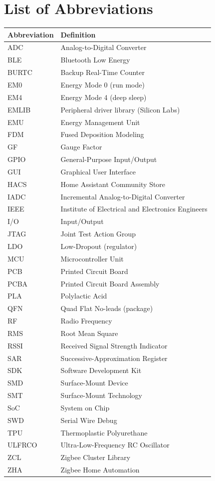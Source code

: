 \chapter*{List of Abbreviations}

\begin{center}
\renewcommand{\arraystretch}{1}
\begin{tabularx}{\textwidth}{@{} l X @{}}
\toprule
\textbf{Abbreviation} & \textbf{Definition} \\
\midrule
ADC    & Analog-to-Digital Converter \\
BLE    & Bluetooth Low Energy \\
BURTC  & Backup Real-Time Counter \\
EM0    & Energy Mode 0 (run mode) \\
EM4    & Energy Mode 4 (deep sleep) \\
EMLIB  & Peripheral driver library (Silicon Labs) \\
EMU    & Energy Management Unit \\
FDM    & Fused Deposition Modeling \\
GF     & Gauge Factor \\
GPIO   & General-Purpose Input/Output \\
GUI    & Graphical User Interface \\
HACS   & Home Assistant Community Store \\
IADC   & Incremental Analog-to-Digital Converter \\
IEEE   & Institute of Electrical and Electronics Engineers \\
I/O    & Input/Output \\
JTAG   & Joint Test Action Group \\
LDO    & Low-Dropout (regulator) \\
MCU    & Microcontroller Unit \\
PCB    & Printed Circuit Board \\
PCBA   & Printed Circuit Board Assembly \\
PLA    & Polylactic Acid \\
QFN    & Quad Flat No-leads (package) \\
RF     & Radio Frequency \\
RMS    & Root Mean Square \\
RSSI   & Received Signal Strength Indicator \\
SAR    & Successive-Approximation Register \\
SDK    & Software Development Kit \\
SMD    & Surface-Mount Device \\
SMT    & Surface-Mount Technology \\
SoC    & System on Chip \\
SWD    & Serial Wire Debug \\
TPU    & Thermoplastic Polyurethane \\
ULFRCO & Ultra-Low-Frequency RC Oscillator \\
ZCL    & Zigbee Cluster Library \\
ZHA    & Zigbee Home Automation \\
\bottomrule
\end{tabularx}
\end{center}